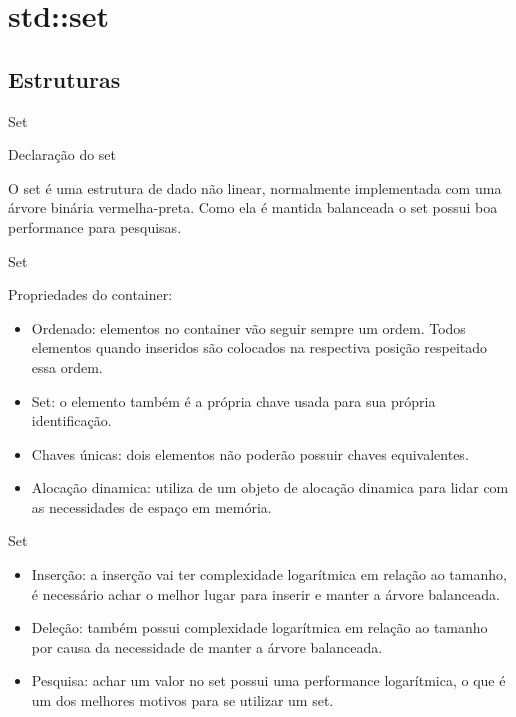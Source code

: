 \section{std::set}

\subsection{Estruturas}

\begin{frame}[fragile]{Set}

    \begin{block}{Declaração do set}
    \end{block}
	
    O set é uma estrutura de dado não linear, normalmente implementada com uma árvore binária vermelha-preta. Como ela é mantida balanceada o set possui boa performance para pesquisas.
         
\end{frame}

\begin{frame}[fragile]{Set}


    Propriedades do container:

    \begin{itemize}
        \item Ordenado: elementos no container vão seguir sempre um ordem. Todos elementos quando inseridos são colocados na respectiva posição respeitado essa ordem.
        \item Set: o elemento também é a própria chave usada para sua própria identificação.
        \item Chaves únicas: dois elementos não poderão possuir chaves equivalentes.
        \item Alocação dinamica: utiliza de um objeto de alocação dinamica para lidar com as necessidades de espaço em memória.
    \end{itemize}

\end{frame}

\begin{frame}[fragile]{Set}

    \begin{itemize}
        \item Inserção: a inserção vai ter complexidade logarítmica em relação ao tamanho, é necessário achar o melhor lugar para inserir e manter a árvore balanceada. 
        \item Deleção: também possui complexidade logarítmica em relação ao tamanho por causa da necessidade de manter a árvore balanceada.
        \item Pesquisa: achar um valor no set possui uma performance logarítmica, o que é um dos melhores motivos para se utilizar um set.
    \end{itemize}

\end{frame}

